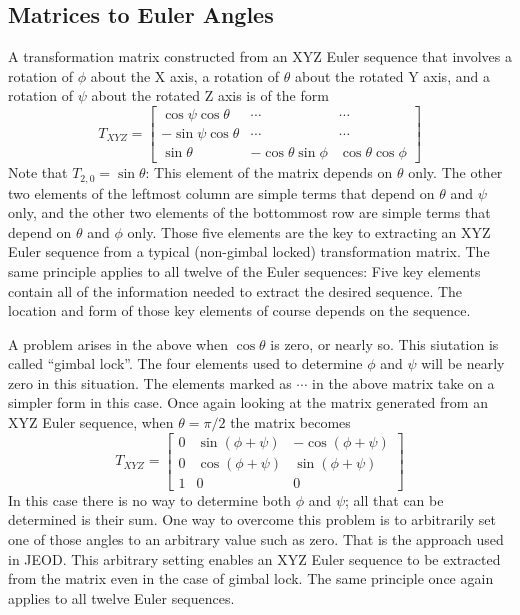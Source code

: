 \subsection{Matrices to Euler Angles}
A transformation matrix constructed from an XYZ Euler sequence that involves
a rotation of $\phi$ about the X axis, a rotation of $\theta$ about the rotated
Y axis, and a rotation of $\psi$ about the rotated Z axis is of the form
\begin{equation*}
  T_{XYZ} =
  \begin{bmatrix}
     \cos\psi\cos\theta & \cdots & \cdots \\
    -\sin\psi\cos\theta & \cdots & \cdots \\
     \sin\theta  & -\cos\theta\sin\phi & \cos\theta\cos\phi
  \end{bmatrix}
\end{equation*}
Note that $T_{2,0}=\sin\theta$: This element of the matrix depends on
$\theta$ only. The other two elements of the leftmost column are simple terms
that depend on $\theta$ and $\psi$ only, and the other two elements of the
bottommost row are simple terms that depend on $\theta$ and $\phi$ only.
Those five elements are the key to extracting an XYZ Euler sequence from a
typical (non-gimbal locked) transformation matrix.
The same principle applies to all twelve of the Euler sequences:
Five key elements contain all of the information needed to extract the
desired sequence. The location and form of those key elements of course
depends on the sequence.

A problem arises in the above when $\cos\theta$ is zero, or nearly so. This
siutation is called ``gimbal lock''. The four elements used to determine $\phi$
and $\psi$ will be nearly zero in this situation. The elements marked as
$\cdots$ in the above matrix take on a simpler form in this case.
Once again looking at the matrix generated from an
XYZ Euler sequence, when $\theta=\pi/2$ the matrix becomes
\begin{equation*}
  T_{XYZ} =
  \begin{bmatrix}
     0 & \sin(\phi+\psi) & -\cos(\phi+\psi) \\
     0 & \cos(\phi+\psi) & \sin(\phi+\psi) \\
     1 & 0 & 0
  \end{bmatrix}
\end{equation*}
In this case there is no way to determine both $\phi$ and $\psi$; all that can
be determined is their sum. One way to overcome this problem is to arbitrarily
set one of those angles to an arbitrary value such as zero. That is the
approach used in JEOD. This arbitrary setting enables an XYZ Euler
sequence to be extracted from the matrix even in the case of gimbal lock.
The same principle once again applies to all twelve Euler sequences.

